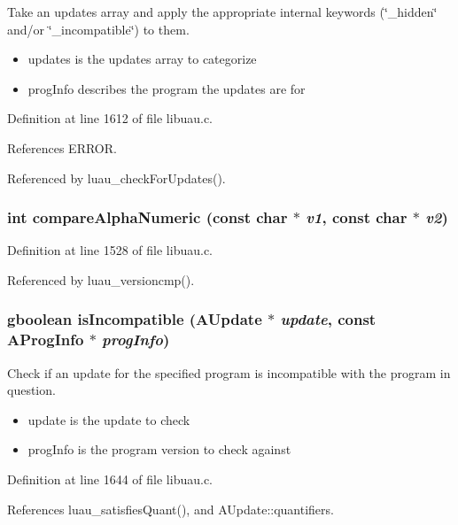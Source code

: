Take an updates array and apply the appropriate internal keywords (\char`\"{}\_\-hidden\char`\"{} and/or \char`\"{}\_\-incompatible\char`\"{}) to them.

\begin{itemize}
\item updates is the updates array to categorize \item prog\-Info describes the program the updates are for \end{itemize}


Definition at line 1612 of file libuau.c.

References ERROR.

Referenced by luau\_\-check\-For\-Updates().
\subsubsection{\setlength{\rightskip}{0pt plus 5cm}int compare\-Alpha\-Numeric (const char $\ast$ {\em v1}, const char $\ast$ {\em v2})\hspace{0.3cm}{\tt  [static]}}\label{libuau_8c_a0}




Definition at line 1528 of file libuau.c.

Referenced by luau\_\-versioncmp().
\subsubsection{\setlength{\rightskip}{0pt plus 5cm}gboolean is\-Incompatible ({\bf AUpdate} $\ast$ {\em update}, const {\bf AProg\-Info} $\ast$ {\em prog\-Info})\hspace{0.3cm}{\tt  [static]}}\label{libuau_8c_a3}


Check if an update for the specified program is incompatible with the program in question.

\begin{itemize}
\item update is the update to check \item prog\-Info is the program version to check against \end{itemize}


Definition at line 1644 of file libuau.c.

References luau\_\-satisfies\-Quant(), and AUpdate::quantifiers.
